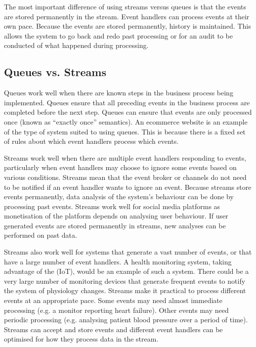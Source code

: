 The most important difference of using streams versus queues is that the events are stored permanently in the stream.
Event handlers can process events at their own pace.
Because the events are stored permanently, history is maintained.
This allows the system to go back and redo past processing or for an audit to be conducted of what happened during processing.

\subsection{Queues vs. Streams}

Queues work well when there are known steps in the business process being implemented.
Queues ensure that all preceding events in the business process are completed before the next step.
Queues can ensure that events are only processed once (known as ``exactly once'' semantics).
An ecommerce website is an example of the type of system suited to using queues.
This is because there is a fixed set of rules about which event handlers process which events.

Streams work well when there are multiple event handlers responding to events,
particularly when event handlers may choose to ignore some events based on various conditions.
Streams mean that the event broker or channels do not need to be notified if an event handler wants to ignore an event.
Because streams store events permanently, data analysis of the system's behaviour can be done by processing past events.
Streams work well for social media platforms as monetisation of the platform depends on analysing user behaviour.
If user generated events are stored permanently in streams, new analyses can be performed on past data.

Streams also work well for systems that generate a vast number of events,
or that have a large number of event handlers.
A health monitoring system, taking advantage of the  (IoT),
would be an example of such a system.
There could be a very large number of monitoring devices that generate frequent events to notify the system of physiology changes.
Streams make it practical to process different events at an appropriate pace.
Some events may need almost immediate processing (e.g. a monitor reporting heart failure).
Other events may need periodic processing (e.g. analysing patient blood pressure over a period of time).
Streams can accept and store events and different event handlers can be optimised for how they process data in the stream.

